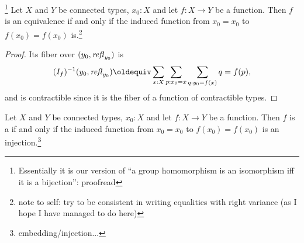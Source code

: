 {\begin{lemma}\label{lem:eqofconntypes}\footnote{
Essentially it is our version of ``a group homomorphism is an isomorphism iff it is a bijection'': proofread}
  Let $X$ and $Y$ be connected types, $x_0:X$ and let $f:X\to Y$ be a function.  Then $f$ is an equivalence if and only if the induced function from $x_0=x_0$ to $f(x_0)=f(x_0)$ is.\footnote{note to self: try to be consistent in writing equalities with right variance (as I hope I have managed to do here)}
\end{lemma}
\begin{proof}
  

 Its fiber over $(y_0,\mathop{{\it refl}_{y_0}})$ is 
$$(\uc{f})^{-1}(y_0,\refl{y_0})\oldequiv\sum_{x:X}\sum_{p:x_0=x}\sum_{q:y_0=f(x)}q=f(p),$$ and is contractible since it is the fiber of a function of contractible types.  
\end{proof}
\begin{lemma}
  Let $X$ and $Y$ be connected types, $x_0:X$ and let $f:X\to Y$ be a function.  Then $f$ is a \covering if and only if the induced function from $x_0=x_0$ to $f(x_0)=f(x_0)$ is an injection.\footnote{embedding/injection...}
\end{lemma}





}
